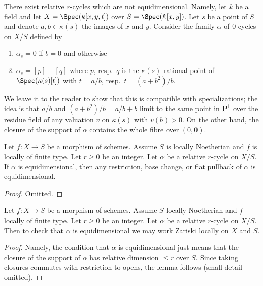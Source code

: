 \begin{example}
\label{example-not-equidimensional}
\begin{reference}
\cite[Example 3.1.9]{SV}
\end{reference}
There exist relative $r$-cycles which are not equidimensional.
Namely, let $k$ be a field and let $X = \Spec(k[x, y, t])$
over $S = \Spec(k[x, y])$. Let $s$ be a point of $S$ and
denote $a, b \in \kappa(s)$ the images of $x$ and $y$.
Consider the family $\alpha$ of $0$-cycles on $X/S$ defined by
\begin{enumerate}
\item $\alpha_s = 0$ if $b = 0$ and otherwise
\item $\alpha_s = [p] - [q]$ where $p$, resp.\ $q$ is the $\kappa(s)$-rational
point of $\Spec(\kappa(s)[t])$ with $t = a/b$,
resp.\ $t = (a + b^2)/b$.
\end{enumerate}
We leave it to the reader to show that this is compatible with specializations;
the idea is that $a/b$ and $(a + b^2)/b = a/b + b$ limit to the same point
in $\mathbf{P}^1$ over the residue field of any valuation $v$ on $\kappa(s)$
with $v(b) > 0$. On the other hand, the closure of the support of $\alpha$
contains the whole fibre over $(0, 0)$.
\end{example}

\begin{lemma}
\label{lemma-equidimensional-functoriality}
Let $f : X \to S$ be a morphism of schemes. Assume $S$ is locally Noetherian
and $f$ is locally of finite type. Let $r \geq 0$ be an integer. Let
$\alpha$ be a relative $r$-cycle on $X/S$. If $\alpha$ is equidimensional,
then any restriction, base change, or flat pullback of $\alpha$ is
equidimensional.
\end{lemma}

\begin{proof}
Omitted.
\end{proof}

\begin{lemma}
\label{lemma-check-equidimensional}
Let $f : X \to S$ be a morphism of schemes. Assume $S$ locally Noetherian
and $f$ locally of finite type. Let $r \geq 0$ be an integer. Let $\alpha$
be a relative $r$-cycle on $X/S$. Then to check that $\alpha$ is equidimensional
we may work Zariski locally on $X$ and $S$.
\end{lemma}

\begin{proof}
Namely, the condition that $\alpha$ is equidimensional just means that
the closure of the support of $\alpha$ has relative dimension $\leq r$
over $S$. Since taking closures commutes with restriction to opens,
the lemma follows (small detail omitted).
\end{proof}

